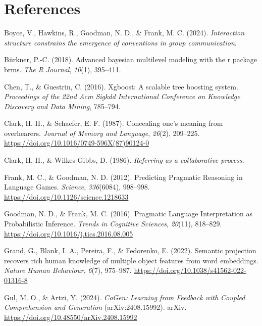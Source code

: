 \documentclass[10pt, letterpaper]{article}
\begin{document}
\section{References}\label{references}

\setlength{\parindent}{-0.1in} 
\setlength{\leftskip}{0.125in}

\noindent

\label{refs}
\begin{CSLReferences}{1}{0}
Boyce, V., Hawkins, R., Goodman, N. D., \& Frank, M. C. (2024).
\emph{Interaction structure constrains the emergence of conventions in
group communication}.

Bürkner, P.-C. (2018). Advanced bayesian multilevel modeling with the r
package brms. \emph{The R Journal}, \emph{10}(1), 395--411.

Chen, T., \& Guestrin, C. (2016). Xgboost: {A} scalable tree boosting
system. \emph{Proceedings of the 22nd Acm Sigkdd International
Conference on Knowledge Discovery and Data Mining}, 785--794.

Clark, H. H., \& Schaefer, E. F. (1987). Concealing one's meaning from
overhearers. \emph{Journal of Memory and Language}, \emph{26}(2),
209--225. \url{https://doi.org/10.1016/0749-596X(87)90124-0}

Clark, H. H., \& Wilkes-Gibbs, D. (1986). \emph{Referring as a
collaborative process}.

Frank, M. C., \& Goodman, N. D. (2012). Predicting {Pragmatic Reasoning}
in {Language Games}. \emph{Science}, \emph{336}(6084), 998--998.
\url{https://doi.org/10.1126/science.1218633}

Goodman, N. D., \& Frank, M. C. (2016). Pragmatic {Language
Interpretation} as {Probabilistic Inference}. \emph{Trends in Cognitive
Sciences}, \emph{20}(11), 818--829.
\url{https://doi.org/10.1016/j.tics.2016.08.005}

Grand, G., Blank, I. A., Pereira, F., \& Fedorenko, E. (2022). Semantic
projection recovers rich human knowledge of multiple object features
from word embeddings. \emph{Nature Human Behaviour}, \emph{6}(7),
975--987. \url{https://doi.org/10.1038/s41562-022-01316-8}

Gul, M. O., \& Artzi, Y. (2024). \emph{{CoGen}: {Learning} from
{Feedback} with {Coupled Comprehension} and {Generation}}
(arXiv:2408.15992). arXiv.
\url{https://doi.org/10.48550/arXiv.2408.15992}


\end{CSLReferences}
\end{document}
